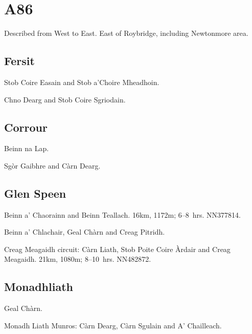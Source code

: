 
\section{A86}

Described from West to East.  East of Roybridge, including Newtonmore area.

\subsection{Fersit}

\begin{munros}
\item
Stob Coire Easain and Stob a'Choire Mheadhoin.

\item
Chno Dearg and Stob Coire Sgriodain.  \tick
\end{munros}


\subsection{Corrour}

\begin{munros}
\item
Beinn na Lap.

\item
Sgòr Gaibhre and Càrn Dearg.
\end{munros}


\subsection{Glen Speen} 

\begin{munros}
\item
Beinn a' Chaorainn and Beinn Teallach.  16km, 1172m; 6--8~hrs.  NN377814.  \tick

\item
Beinn a' Chlachair, Geal Chàrn and Creag Pitridh.

\item
Creag Meagaidh circuit: Càrn Liath, Stob Poite Coire Àrdair and Creag
Meagaidh.  21km, 1080m; 8--10~hrs.  NN482872.  \tick
\end{munros}


\subsection{Monadhliath}

\begin{munros}
\item
Geal Chàrn.

\item
Monadh Liath Munros: Càrn Dearg, Càrn Sgulain and A' Chailleach.
\end{munros}
